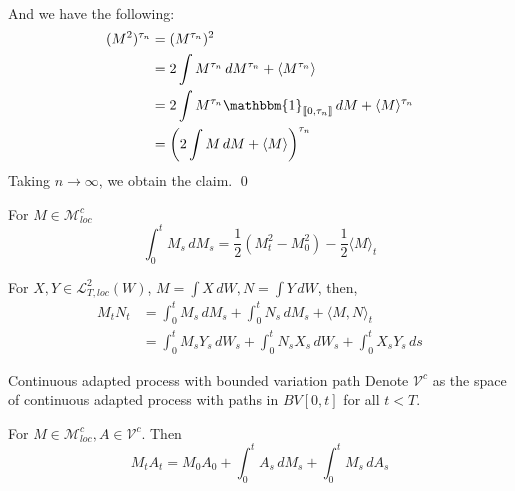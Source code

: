 \documentclass[12pt,a4paper]{article}
\renewenvironment{proof}
    {\begin{trivlist}\item[\hskip\labelsep\color{blue}\bfseries Proof:]}
    {\qed\end{trivlist}}
\begin{document}
\begin{proof}
    \\
    And we have the following:
    \begin{align*}
        (M^2)^{\tau_n} &= (M^{\tau_n})^2\\
        &= 2\int M^{\tau_n}\,dM^{\tau_n} + \langle M^{\tau_n}\rangle\\
        &= 2\int M^{\tau_n}\mathbbm{1}_{\llbracket 0,\tau_n\rrbracket} \,dM + \langle M\rangle^{\tau_n}\\
        &= \left(2\int M\, dM + \langle M\rangle \right)^{\tau_n}
    \end{align*}
    Taking $n\to\infty$, we obtain the claim.
\end{proof}
\begin{corollary}{}{}
    For $M\in\mathcal{M}^c_{loc}$
    $$
    \int_0^t M_s\, dM_s = \frac{1}{2}(M_t^2-M_0^2)-\frac{1}{2}\langle M\rangle_t
    $$
\end{corollary}
\begin{corollary}{}{}
    For $X,Y\in\mathcal{L}^2_{T,loc}(W)$, $M = \int X\,dW, N = \int Y\, dW$, then,
    \begin{align*}
        M_tN_t &= \int_0^t M_s\, dM_s + \int_0^t N_s\, dM_s + \langle M,N\rangle_t\\
        &= \int_0^t M_s Y_s\, dW_s + \int_0^t N_sX_s\, dW_s + \int_0^t X_s Y_s\,ds
    \end{align*}
\end{corollary}
\pagebreak
\begin{definition}{Continuous adapted process with bounded variation path}{}
    Denote $\mathcal{V}^c$ as the space of continuous adapted process with paths in $BV[0,t]$ for all $t<T$.
\end{definition}
\begin{proposition}{}{}
    For $M\in\mathcal{M}^{c}_{loc}, A\in \mathcal{V}^c$. Then
    $$
    M_tA_t = M_0A_0 + \int_0^t A_s\, dM_s + \int_0^t M_s\, dA_s
    $$
\end{proposition}
\end{document}
